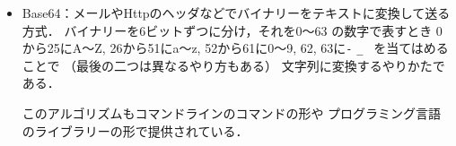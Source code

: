 \begin{itemize}
\begin{enumerate}
      \item
         JSON = JavaScript Object Notation：元々はJavaScriptの連想配列から
         作ったもの\footnote{JSONは2001年クロックフォードによりJavaScript
         の中から「発見」されたといわれている．}だが最近色々な所で使われる(図~\ref{JSON})．
         npm では package.json という
         ソフトウェアの依存性を記述したファイルがよく使われている．
         
      \item   
         YAML = YAML Ain’t Markup Language：Pythonに似た構造化データ．
         JSONよりコンパクトに記述できる(図~\ref{YAML})．
         ソフトの設定などに使われる．
     \item 
        XML  = eXtendable Markup Language： 
        HTML に似たデータ記述言語で一時期はやったが，
        最近はあまり使われない．しかし，
        パソコンの内部では今でもよく使われている．
              
   \end{enumerate}
   \emptyline

これらのアルゴリズムはコマンドラインのコマンドの形や，
   プログラミング言語のライブラリーの形で提供されている．
   
   \begin{Q}
      yaml, json, xml 間の変換：yq\, を使う
      
\begin{verbatim}
   % cat math.json 
[
   {
      "lastname": "円", 
      "firstname": "周率"
   },
   {
      "lastname": "黄金", 
      "firstname": "率"
   },
   {
      "lastname": "虚数", 
      "firstname": "単位"
   }     
]
   % brew install yq #yqがインストールされていないとき
   % yq -P -oy math.json > math.yml 
   % cat math.yml
- lastname: 円
  firstname: 周率
- lastname: 黄金
  firstname: 率
- lastname: 虚数
  firstname: 単位
   % yq -o json math.yml  > math2.json
\end{verbatim}


   \end{Q}

   \item
      Base64：メールやHttpのヘッダなどでバイナリーをテキストに変換して送る方式．
      バイナリーを$6$ビットずつに分け，それを0〜63 の数字で表すとき
      0から25にA〜Z, 26から51にa〜z, 52から61に0〜9, 
      62, 63に\verb/-/  \verb/_ / を当てはめることで
      （最後の二つは異なるやり方もある）
      文字列に変換するやりかたである．
      \emptyline
      
      このアルゴリズムもコマンドラインのコマンドの形や
      プログラミング言語のライブラリーの形で提供されている．
\begin{Q}\, 


\end{Q}
\end{itemize}
